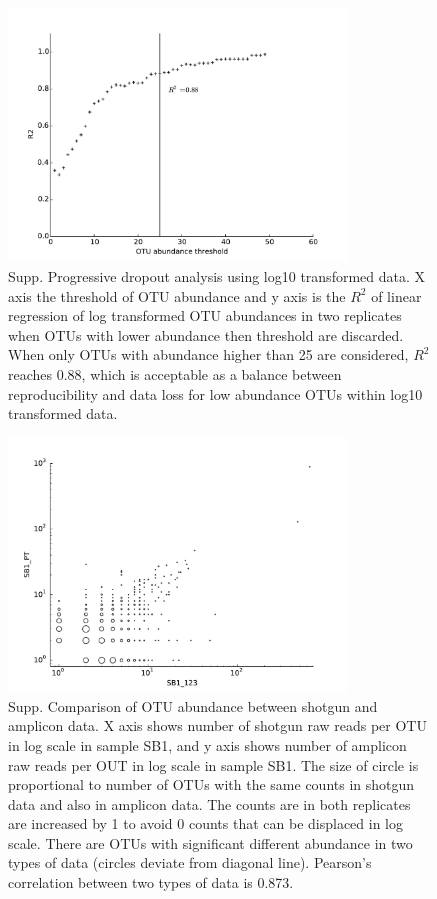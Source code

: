 \documentclass[12pt]{article}
\begin{document}
\begin{figure}[tbph!]
  \centering
  \includegraphics[width=0.8\textwidth]{figs/SB1_techrep_OTUscatR2}
  \caption[Progressive dropout analysis using log10 transformed data]{Supp. Progressive dropout analysis using log10 transformed data. X axis the threshold of OTU abundance and y axis is the $R^2$ of linear regression of log transformed OTU abundances in two replicates when OTUs with lower abundance then threshold are discarded. When only OTUs with abundance higher than 25 are considered, $R^2$ reaches 0.88,  which is acceptable as a balance between reproducibility and data loss for low abundance OTUs within log10 transformed data.}
  \label{fig:SB1_techrep_OTUscatR2}
\end{figure}

\begin{figure}[tbph!]
  \centering
  \includegraphics[width=0.8\textwidth]{figs/SB1_SGvsPT_OTUscat}
  \caption[Comparison of OTU abundance between shotgun and amplicon data in sample SB1]{Supp. Comparison of OTU abundance between shotgun and amplicon data. X axis shows number of shotgun raw reads per OTU in log scale in sample SB1, and y axis shows number of amplicon raw reads per OUT in log scale in sample SB1. The size of circle is proportional to number of OTUs with the same counts in shotgun data and also in amplicon data. The counts are in both replicates are increased by 1 to avoid 0 counts that can be displaced in log scale. There are OTUs with significant different abundance in two types of data (circles deviate from diagonal line). Pearson’s correlation between two types of data is 0.873.}
  \label{fig:SB1_SGvsPT_OTUscat}
\end{figure}
\end{document}
